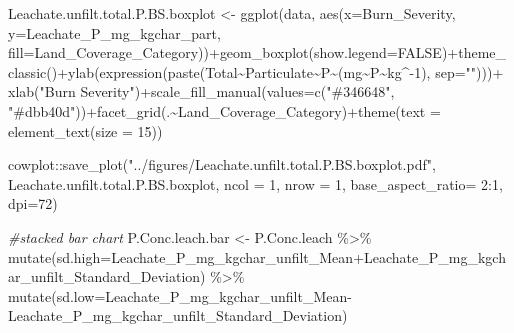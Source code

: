 \documentclass[
]{article}
\newenvironment{Shaded}{\begin{snugshade}}{\end{snugshade}}
\newcommand{\AttributeTok}[1]{\textcolor[rgb]{0.77,0.63,0.00}{#1}}
\newcommand{\CommentTok}[1]{\textcolor[rgb]{0.56,0.35,0.01}{\textit{#1}}}
\newcommand{\ConstantTok}[1]{\textcolor[rgb]{0.00,0.00,0.00}{#1}}
\newcommand{\DecValTok}[1]{\textcolor[rgb]{0.00,0.00,0.81}{#1}}
\newcommand{\FunctionTok}[1]{\textcolor[rgb]{0.00,0.00,0.00}{#1}}
\newcommand{\NormalTok}[1]{#1}
\newcommand{\OtherTok}[1]{\textcolor[rgb]{0.56,0.35,0.01}{#1}}
\newcommand{\SpecialCharTok}[1]{\textcolor[rgb]{0.00,0.00,0.00}{#1}}
\newcommand{\StringTok}[1]{\textcolor[rgb]{0.31,0.60,0.02}{#1}}
\begin{document}
\begin{Shaded}
\begin{Highlighting}[]
\NormalTok{Leachate.unfilt.total.P.BS.boxplot }\OtherTok{\textless{}{-}} \FunctionTok{ggplot}\NormalTok{(data, }\FunctionTok{aes}\NormalTok{(}\AttributeTok{x=}\NormalTok{Burn\_Severity, }\AttributeTok{y=}\NormalTok{Leachate\_P\_mg\_kgchar\_part, }\AttributeTok{fill=}\NormalTok{Land\_Coverage\_Category))}\SpecialCharTok{+}\FunctionTok{geom\_boxplot}\NormalTok{(}\AttributeTok{show.legend=}\ConstantTok{FALSE}\NormalTok{)}\SpecialCharTok{+}\FunctionTok{theme\_classic}\NormalTok{()}\SpecialCharTok{+}\FunctionTok{ylab}\NormalTok{(}\FunctionTok{expression}\NormalTok{(}\FunctionTok{paste}\NormalTok{(Total}\SpecialCharTok{\textasciitilde{}}\NormalTok{Particulate}\SpecialCharTok{\textasciitilde{}}\NormalTok{P}\SpecialCharTok{\textasciitilde{}}\NormalTok{(mg}\SpecialCharTok{\textasciitilde{}}\NormalTok{P}\SpecialCharTok{\textasciitilde{}}\NormalTok{kg}\SpecialCharTok{\^{}{-}}\DecValTok{1}\NormalTok{), }\AttributeTok{sep=}\StringTok{""}\NormalTok{)))}\SpecialCharTok{+} \FunctionTok{xlab}\NormalTok{(}\StringTok{"Burn Severity"}\NormalTok{)}\SpecialCharTok{+}\FunctionTok{scale\_fill\_manual}\NormalTok{(}\AttributeTok{values=}\FunctionTok{c}\NormalTok{(}\StringTok{"\#346648"}\NormalTok{, }\StringTok{"\#dbb40d"}\NormalTok{))}\SpecialCharTok{+}\FunctionTok{facet\_grid}\NormalTok{(.}\SpecialCharTok{\textasciitilde{}}\NormalTok{Land\_Coverage\_Category)}\SpecialCharTok{+}\FunctionTok{theme}\NormalTok{(}\AttributeTok{text =} \FunctionTok{element\_text}\NormalTok{(}\AttributeTok{size =} \DecValTok{15}\NormalTok{))}

\NormalTok{cowplot}\SpecialCharTok{::}\FunctionTok{save\_plot}\NormalTok{(}\StringTok{"../figures/Leachate.unfilt.total.P.BS.boxplot.pdf"}\NormalTok{, Leachate.unfilt.total.P.BS.boxplot, }\AttributeTok{ncol =} \DecValTok{1}\NormalTok{, }\AttributeTok{nrow =} \DecValTok{1}\NormalTok{, }\AttributeTok{base\_aspect\_ratio=} \DecValTok{2}\SpecialCharTok{:}\DecValTok{1}\NormalTok{, }\AttributeTok{dpi=}\DecValTok{72}\NormalTok{)}


\CommentTok{\#stacked bar chart}
\NormalTok{P.Conc.leach.bar }\OtherTok{\textless{}{-}}\NormalTok{ P.Conc.leach }\SpecialCharTok{\%\textgreater{}\%}
  \FunctionTok{mutate}\NormalTok{(}\AttributeTok{sd.high=}\NormalTok{Leachate\_P\_mg\_kgchar\_unfilt\_Mean}\SpecialCharTok{+}\NormalTok{Leachate\_P\_mg\_kgchar\_unfilt\_Standard\_Deviation) }\SpecialCharTok{\%\textgreater{}\%}
  \FunctionTok{mutate}\NormalTok{(}\AttributeTok{sd.low=}\NormalTok{Leachate\_P\_mg\_kgchar\_unfilt\_Mean}\SpecialCharTok{{-}}\NormalTok{Leachate\_P\_mg\_kgchar\_unfilt\_Standard\_Deviation)}



\end{Highlighting}
\end{Shaded}
\end{document}
